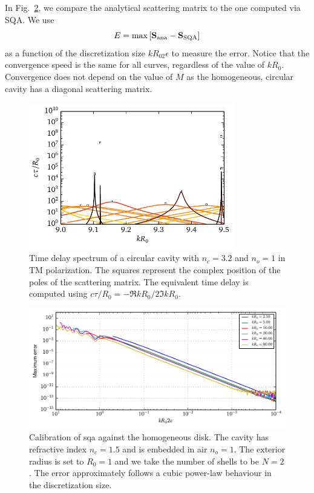 In Fig.~\ref{fig:passive.numerical.convergenceHomogeneousDisk}, we compare the analytical scattering
matrix to the one computed via SQA. We use 
  \begin{equation}
   E = \max\left[\mathbf{S}_\text{ana}-\mathbf{S}_\text{SQA}\right] 
  \end{equation}
as a function of the discretization size $kR_02\epsilon$ to measure
the error. Notice that the convergence speed is the same for all curves, 
regardless of the value of $kR_0$. Convergence does not depend on the value of $M$
as the homogeneous, circular cavity has a diagonal scattering matrix. 

\begin{figure}
  \centering
  \includegraphics[width=0.8\textwidth]{figs/passive/correspondanceRootsPeaks.pdf}
  \caption[Correspondence between the poles of the scattering matrix and the peaks
	  of the time delay spectrum.]
	  {Time delay spectrum of a circular cavity with $n_c=3.2$ and $n_o=1$ in TM polarization. The squares
	  represent the complex position of the poles of the scattering matrix. The equivalent
	  time delay is computed using $c\tau/R_0=-\Re{kR_0}/2\Im{kR_0}$.}
  \label{fig:passive.numerical.correspondanceRoots}
\end{figure}


\begin{figure}
 \centering
 \includegraphics{figs/passive/convergenceHomo.pdf}
 \caption[Convergence properties of SQA when applied on the homogeneous disk]
	  {Calibration of \gls{sqa} against the homogeneous disk. The cavity 
	  has refractive index $n_c=1.5$ and is embedded in air $n_o=1$. The exterior
	  radius is set to $R_0=1$ and we take the number of shells to be $N=2$.
	  The error approximately follows a cubic power-law behaviour in the discretization
	  size.}
 \label{fig:passive.numerical.convergenceHomogeneousDisk}
\end{figure}

